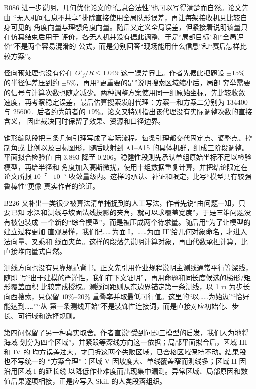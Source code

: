 \documentclass[UTF8,a4paper,12pt]{ctexart}
\begin{document}
B086 进一步说明，几何优化论文的“信息合法性”也可以写得清楚而自然。论文先由
“无人机间信息不共享”排除直接使用全局队形误差，再让每架接收机只比较自身可见的
角度向量与理想角度向量。随后又定义全局误差，但紧接着说明该量只在仿真结束后用于
评价，各无人机并没有据此调整。于是“局部目标”和“全局评价”不是两个容易混淆的
公式，而是分别回答“现场能用什么信息”和“赛后怎样比较方案”。

径向预处理也没有停在 $O'_j/R\leq1.049$ 这一误差界上。作者先据此把题设
$\pm15\%$ 的半径偏差压到约 $\pm5\%$，再用“更重要的是”说明搜索区域缩小后，局部
穷举需要的信号与计算次数也随之减少。两种调整方案使用同一组原始坐标，先比较收敛
速度，再考察稳定误差，最后估算搜索发射代理：方案一和方案二分别为 $134400$ 与
$25600$，后者约为前者的 $19\%$。论文又特别指出该代理没有实际调整次数的直接含义，
因此裁决同时保留了效果、资源和口径边界。

锥形编队段把三条几何引理写成了实际流程。每条引理都交代固定点、调整点、控制角或
比例以及目标图形，随后映射到 A1--A15 的具体机群，组成三阶段调整。平面拟合检验值
由 $3.893$ 降至 $0.206$。稳健性段则先承认单组原始坐标不足以检验模型，再给半径和
角度加入高斯微扰，使用十组数据重复计算，并把结论限定在论文所报 $10^{-7}$--
$10^{-5}$ 收敛量级内。这样的承认、补证和限定，比写“模型具有较强鲁棒性”更像
真实作者的论证。

B226 又补出一类很少被算法清单捕捉到的人工写法。作者先说“由问题一知，只要已知
水深和测线与坡面法线投影的夹角，就可以求覆盖宽度”，于是三维问题没有被包装成
一个新的“综合模型”，而是被压成两个待求量。随后用“为了让模型的建立过程更加
直观易懂，我们记……为面 I，……为面 II”给几何对象命名，才进入法向量、叉乘和
线面夹角。这样的段落先说明计算对象，再由代数承担计算，比直接堆向量式自然。

测线方向也没有只靠规范背书。正文先引用作业规程说明主测线通常平行等深线，随即
写“出于建模的严谨性，我们在下文证明”，再用命题和同长度候选的梯形/矩形覆盖面积
比较完成授权。测线间距则从东边界锚定第一条测线，以 1 m 为步长向西搜索，只保留
$10\%$--$20\%$ 重叠率并取最低可行值。这里的“以……为始边”“恰好能达到……”“从
第一条测线开始”不是装饰性连接词，而是直接对应初始化、步长、可行域和选择规则。

第四问保留了另一种真实取舍。作者直说“受到问题三模型的启发，我们人为地将海域
划分为四个区域”，并紧跟等深线方向这一依据；局部平面拟合后，区域 III 和 IV 的
均方误差过大，才只拆这两个失败区域，已合格区域保持不动。结果段也不写统一的
“方案合理”：区域 V 因坡度大、单线覆盖窄而测线多；区域 II 因沿用区域 I 的延长线
以降低作业难度而出现集中漏测。异常区域、局部原因和数值后果逐项相接，正是应写入
Skill 的人类段落组织。
\end{document}
